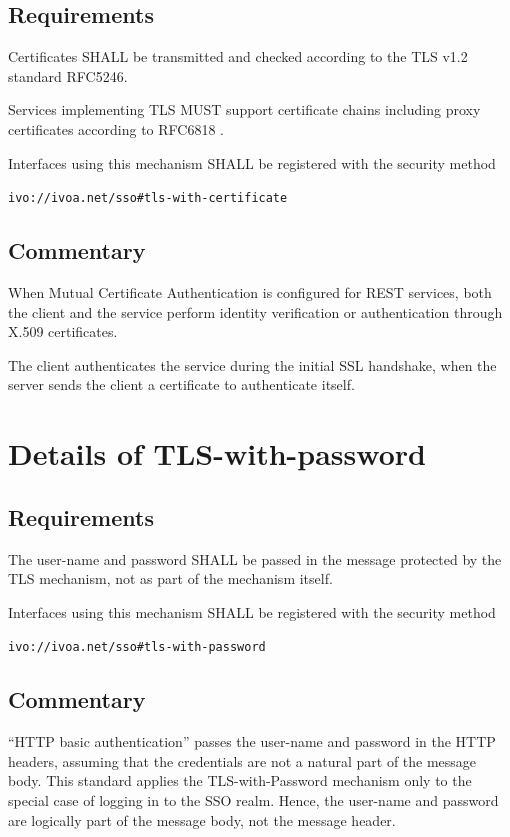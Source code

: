\documentclass[11pt,a4paper]{ivoa}
\begin{document}
{{{\subsection{Requirements}
Certificates SHALL be transmitted and checked according to the TLS v1.2 standard RFC5246.

Services implementing TLS MUST support certificate chains including proxy certificates according to RFC6818  \citep{std:RFC6818}.

Interfaces using this mechanism SHALL be  registered with the security method

\texttt{ivo://ivoa.net/sso\#tls-with-certificate}

\subsection{Commentary}
When Mutual Certificate Authentication is configured for REST services, both the client and the service perform
identity verification or authentication through X.509 certificates.

The client authenticates the service during the initial SSL handshake, when the server sends the client a certificate to authenticate itself.

\section{Details of TLS-with-password}
\subsection{Requirements}
The user-name and password SHALL be passed in the message protected by the TLS mechanism,
not as part of the mechanism itself.

Interfaces using this mechanism SHALL  be registered with the security method

\texttt{ivo://ivoa.net/sso\#tls-with-password}

\subsection{Commentary}
``HTTP basic authentication'' passes the user-name and password in the HTTP headers,
assuming that the credentials are not a natural part of the message body.
This standard applies the TLS-with-Password mechanism only to the special case of logging in to the SSO realm.
Hence, the user-name and password are logically part of the message body, not the message header.

}}}
\end{document}
